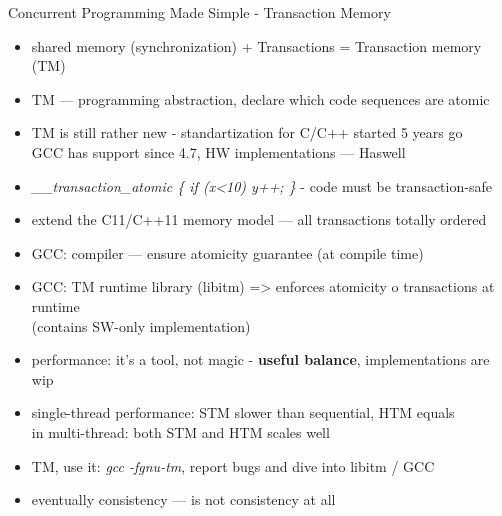 \documentclass[aspectratio=169]{beamer}
\begin{document}
\begin{frame}{Concurrent Programming Made Simple - Transaction Memory}
  \begin{itemize}
  \item shared memory (synchronization) + Transactions = Transaction memory (TM)
  \item TM --- programming abstraction, declare which code sequences are atomic
  \item TM is still rather new - standartization for C/C++ started 5 years go
        \\GCC has support since 4.7, HW implementations --- Haswell
  \item {\it \_\_transaction\_atomic \{ if (x<10) y++; \}} - code must be transaction-safe
  \item extend the C11/C++11 memory model --- all transactions totally ordered
  \item GCC: compiler --- ensure atomicity guarantee (at compile time)
  \item GCC: TM runtime library (libitm) => enforces atomicity o transactions at runtime
        \\(contains SW-only implementation)
  \item performance: it's a tool, not magic - {\bf useful balance}, implementations are wip
  \item single-thread performance: STM slower than sequential, HTM equals
        \\in multi-thread: both STM and HTM scales well
  \item TM, use it: {\it gcc -fgnu-tm}, report bugs and dive into libitm / GCC
  \item eventually consistency --- is not consistency at all
  \end{itemize}
\end{frame}
\end{document}
